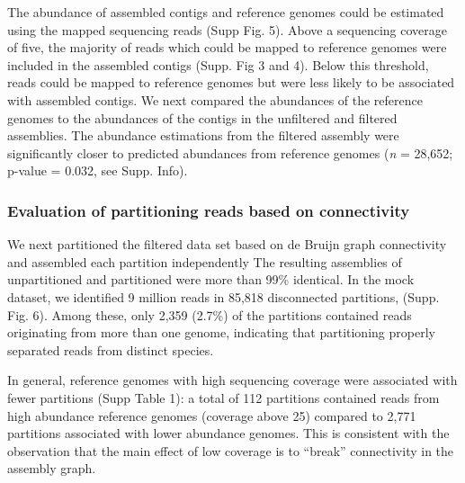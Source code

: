 \documentclass[11pt]{article} %
\begin{document}
The abundance of assembled contigs and reference genomes could be
estimated using the mapped sequencing reads (Supp Fig. 5).  Above a
sequencing coverage of five, the majority of reads which could be
mapped to reference genomes were included in the assembled contigs
(Supp. Fig 3 and 4).  Below this threshold, reads could be mapped to
reference genomes but were less likely to be associated with assembled
contigs.  We next compared the abundances of the reference genomes to
the abundances of the contigs in the unfiltered and filtered
assemblies.  The abundance estimations from the filtered assembly were
significantly closer to predicted abundances from reference genomes
(\emph{n} = 28,652; p-value = 0.032, see Supp. Info).

\subsubsection{Evaluation of partitioning reads based on connectivity}

We next partitioned the filtered data set based on de Bruijn graph
connectivity and assembled each partition independently
\cite{Pell:2012cq, howeartifacts} The resulting assemblies of
unpartitioned and partitioned were more than 99\% identical.  In the
mock dataset, we identified 9 million reads in 85,818 disconnected
partitions, (Supp. Fig. 6).  Among these, only 2,359 (2.7\%) of the
partitions contained reads originating from more than one genome,
indicating that partitioning properly separated reads from distinct
species.


In general, reference genomes with high sequencing coverage were
associated with fewer partitions (Supp Table 1): a
total of 112 partitions contained reads from high abundance reference
genomes (coverage above 25) compared to 2,771 partitions associated
with lower abundance genomes.  This is consistent
with the observation that the main effect of low coverage is to
``break'' connectivity in the assembly graph.

\end{document}
